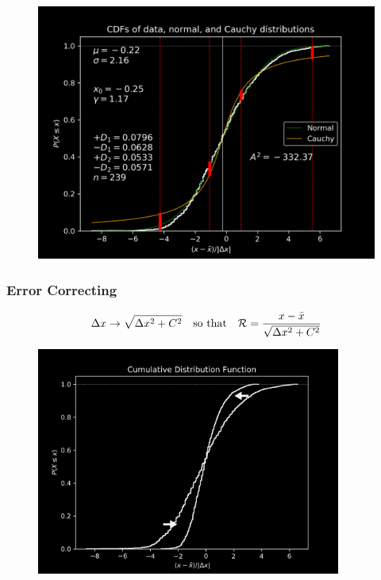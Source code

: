 \documentclass[9pt]{beamer}
\begin{document}
\begin{frame}


\begin{figure}[h]
\centering
\includegraphics[width=\textwidth]{cauchy_cdf}
\label{fig:cauchy_cdf}
\end{figure}
\end{frame}


\begin{frame}
\frametitle{Error Correcting}

\[
\Delta x \rightarrow \sqrt{\Delta x^2 + C^2}
\qq{so that}
\mathcal{R} = \frac{x-\bar x}{\sqrt{\Delta x^2 + C^2}}
\]
\begin{figure}[h]
\centering
\includegraphics[width=10cm]{err_cor1}
\label{fig:err_cor1}
\end{figure}
\end{frame}
\end{document}
